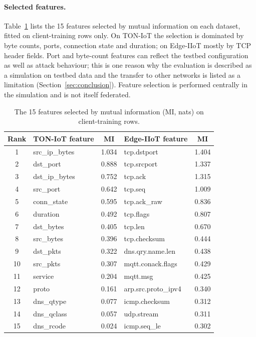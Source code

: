 \documentclass[pdflatex,sn-mathphys-num]{sn-jnl}
\begin{document}
{{{{{\paragraph{Selected features.} Table~\ref{tab:a_features} lists the 15 features selected by mutual information on each dataset, fitted on client-training rows only. On TON-IoT the selection is dominated by byte counts, ports, connection state and duration; on Edge-IIoT mostly by TCP header fields. Port and byte-count features can reflect the testbed configuration as well as attack behaviour; this is one reason why the evaluation is described as a simulation on testbed data and the transfer to other networks is listed as a limitation (Section~\ref{sec:conclusion}). Feature selection is performed centrally in the simulation and is not itself federated.
\begin{table}[!htbp]\centering
\caption{The 15 features selected by mutual information (MI, nats) on client-training rows.}\label{tab:a_features}
\scriptsize
\setlength{\tabcolsep}{4pt}
\begin{tabular}{clclc}\toprule
Rank & TON-IoT feature & MI & Edge-IIoT feature & MI \\ \midrule
1 & src\_ip\_bytes & 1.034 & tcp.dstport & 1.404 \\
2 & dst\_port & 0.888 & tcp.srcport & 1.337 \\
3 & dst\_ip\_bytes & 0.752 & tcp.ack & 1.315 \\
4 & src\_port & 0.642 & tcp.seq & 1.009 \\
5 & conn\_state & 0.595 & tcp.ack\_raw & 0.836 \\
6 & duration & 0.492 & tcp.flags & 0.807 \\
7 & dst\_bytes & 0.405 & tcp.len & 0.670 \\
8 & src\_bytes & 0.396 & tcp.checksum & 0.444 \\
9 & dst\_pkts & 0.322 & dns.qry.name.len & 0.438 \\
10 & src\_pkts & 0.307 & mqtt.conack.flags & 0.429 \\
11 & service & 0.204 & mqtt.msg & 0.425 \\
12 & proto & 0.161 & arp.src.proto\_ipv4 & 0.340 \\
13 & dns\_qtype & 0.077 & icmp.checksum & 0.312 \\
14 & dns\_qclass & 0.057 & udp.stream & 0.311 \\
15 & dns\_rcode & 0.024 & icmp.seq\_le & 0.302 \\
\bottomrule\end{tabular}
\end{table}

}}}}}
\end{document}
